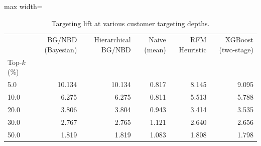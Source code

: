 \begin{table}[htbp]
\centering
\caption{Targeting lift at various customer targeting depths.}
\label{tab:targeting_lift}
\begin{adjustbox}{max width=\linewidth}
\begin{tabular}{lrrrrr}
\toprule
 & BG/NBD (Bayesian) & Hierarchical BG/NBD & Naive (mean) & RFM Heuristic & XGBoost (two-stage) \\
Top-$k$ (\%) &  &  &  &  &  \\
\midrule
5.0 & 10.134 & 10.134 & 0.817 & 8.145 & 9.095 \\
10.0 & 6.275 & 6.275 & 0.811 & 5.513 & 5.788 \\
20.0 & 3.806 & 3.804 & 0.943 & 3.414 & 3.535 \\
30.0 & 2.767 & 2.765 & 1.121 & 2.640 & 2.656 \\
50.0 & 1.819 & 1.819 & 1.083 & 1.808 & 1.798 \\
\bottomrule
\end{tabular}
\end{adjustbox}
\end{table}
